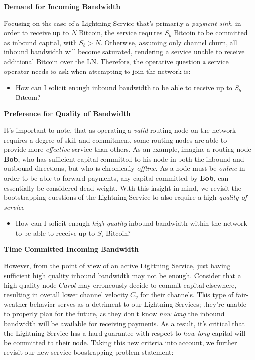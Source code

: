 \documentclass[10pt,a4paper]{article}
\theoremstyle{definition}
\begin{document}
\begin{center}
	\textbf{Demand for Incoming Bandwidth}
\end{center}

Focusing on the case of a Lightning Service that's primarily a \emph{payment
sink}, in order to receive up to $N$ Bitcoin, the service requires $S_b$
Bitcoin to be committed as inbound capital, with $S_b > N$. Otherwise, assuming
only channel churn, all inbound bandwidth will become saturated, rendering a
service unable to receive additional Bitcoin over the LN. Therefore, the
operative question a service operator needs to ask when attempting to join the
network is:

\begin{itemize}
        \item How can I solicit enough inbound bandwidth to be able to receive
            up to $S_b$ Bitcoin?
\end{itemize}


\begin{center}
	\textbf{Preference for Quality of Bandwidth}
\end{center}

It's important to note, that as operating a \emph{valid} routing node on the
network requires a degree of skill and commitment, some routing nodes are able
to provide more \emph{effective} service than others.  As an example, imagine a
routing node \textbf{Bob}, who has sufficient capital committed to his node in
both the inbound and outbound directions, but who is chronically
\emph{offline}. As a node must be \emph{online} in order to be able to forward
payments, any capital committed by \textbf{Bob}, can essentially be considered
dead weight. With this insight in mind, we revisit the bootstrapping questions
of the Lightning Service to also require a high \emph{quality of service}:

\begin{itemize}
        \item How can I solicit enough \emph{high quality} inbound bandwidth
            within the network to be able to receive up to $S_b$ Bitcoin?
\end{itemize}

\begin{center}
	\textbf{Time Committed Incoming Bandwidth}
\end{center}


However, from the point of view of an active Lightning Service, just having
sufficient high quality inbound bandwidth may not be enough. Consider that a
high quality node $Carol$ may erroneously decide to commit capital elsewhere,
resulting in overall lower channel velocity $C_v$ for their channels. This
type of fair-weather behavior serves as a detriment to our Lightning Services;
they're unable to properly plan for the future, as they don't know \emph{how
long} the inbound bandwidth will be available for receiving payments. As a
result, it's critical that the Lightning Service has a hard guarantee with
respect to \emph{how long} capital will be committed to their node. Taking this
new criteria into account, we further revisit our new service boostrapping
problem statement:
\end{document}
